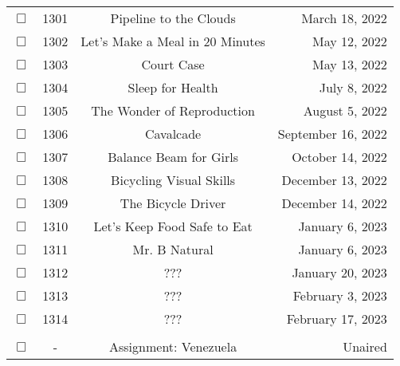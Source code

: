 \documentclass[12pt]{article}
\begin{document}
\begin{center}
\begin{longtable}[c]{cccr}
$\Box$&1301&Pipeline to the Clouds&March 18, 2022\\
$\Box$&1302&Let's Make a Meal in 20 Minutes&May 12, 2022\\
$\Box$&1303&Court Case&May 13, 2022\\
$\Box$&1304&Sleep for Health&July 8, 2022\\
$\Box$&1305&The Wonder of Reproduction&August 5, 2022\\
$\Box$&1306&Cavalcade&September 16, 2022\\
$\Box$&1307&Balance Beam for Girls&October 14, 2022\\
$\Box$&1308&Bicycling Visual Skills&December 13, 2022\\
$\Box$&1309&The Bicycle Driver&December 14, 2022\\
$\Box$&1310&Let's Keep Food Safe to Eat&January 6, 2023\\
$\Box$&1311&Mr. B Natural&January 6, 2023\\
$\Box$&1312&???&January 20, 2023\\
$\Box$&1313&???&February 3, 2023\\
$\Box$&1314&???&February 17, 2023\\

\\  %
$\Box$&-&Assignment: Venezuela&Unaired\\
\end{longtable}\end{center}
\end{document}
